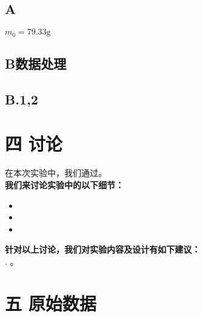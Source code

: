 \documentclass{ctexart}
\begin{document}
\subsection*{A\quad }
\noindent $m_0=79.33\mathrm{g}$\\



\subsection*{B\quad 数据处理}
\subsection*{B.1,2}

 
  
\clearpage
\section*{四 讨论}
在本次实验中，我们通过。\\
\noindent \textbf{我们来讨论实验中的以下细节：}\\
\begin{itemize}
  \item 
  \item 
  \item 
\end{itemize}
\textbf{针对以上讨论，我们对实验内容及设计有如下建议：}\\
. 。\\


\section*{五 原始数据}

\end{document}
